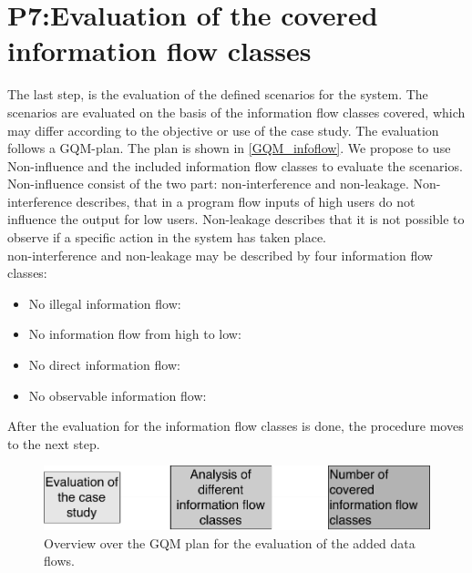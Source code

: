 \section{P7:Evaluation of the covered information flow classes}
The last step, is the evaluation of the defined scenarios for the system. The scenarios are evaluated on the basis of the information flow classes covered, which may differ according to the objective or use of the case study.  The evaluation follows a GQM-plan. The plan is shown in \autoref{GQM_infoflow}.
We propose to use Non-influence \cite{Noninfluence} and the included information flow classes to evaluate the scenarios. Non-influence consist of the two part: non-interference and non-leakage. Non-interference describes, that in a program flow inputs of high users do not influence the output for low users. Non-leakage describes that it is not possible to observe if a specific action in the system has taken place.\\
non-interference and non-leakage may be described by four information flow classes:
\begin{itemize}
\item No illegal information flow:
\item No information flow from high to low:
\item No direct information flow:
\item No observable information flow:
\end{itemize}  %
After the evaluation for the information flow classes is done, the procedure moves to the next step.
\begin{figure}
\includegraphics[scale=0.6]{logos/GQM_infloFlow.pdf}
\caption{Overview over the GQM plan for the evaluation of the added data flows.}
\label{GQM_infoflow}
\end{figure}
